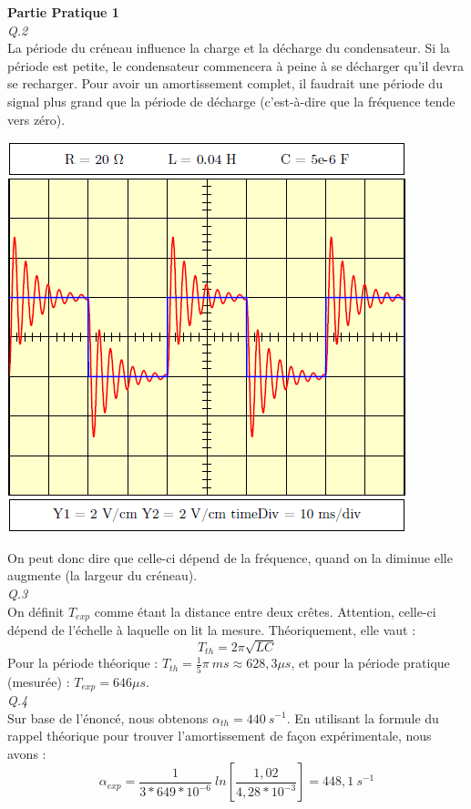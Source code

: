\documentclass	[11pt, a4paper, openany]{book}
\begin{document}
		\textbf{Partie Pratique 1}\\
		\textit{Q.2}\\
		La période du créneau influence la charge et la décharge du condensateur. Si la période est petite, le condensateur commencera à peine à se décharger qu'il devra se recharger. Pour avoir un amortissement complet, il faudrait une période du signal plus grand que la période de décharge (c'est-à-dire que la fréquence tende vers zéro).
		\begin{center}
			\includegraphics[scale=0.5]{labo/image34.png}
		\end{center}
		On peut donc dire que celle-ci dépend de la fréquence, quand on la diminue elle augmente (la largeur du créneau).\\
		
		\textit{Q.3}\\
		On définit $T_{exp}$ comme étant la distance entre deux crêtes. Attention, celle-ci dépend de l'échelle à laquelle on lit la mesure. Théoriquement, elle vaut : 
		\begin{equation}
			T_{th} = 2\pi \sqrt{LC}
		\end{equation}
		Pour la période théorique : $T_{th} = \frac{1}{5}\pi\ ms \approx 628,3\mu s$, et pour la période pratique (mesurée) : $T_{exp} = 646 \mu s$.\\
		
		\textit{Q.4}\\
		Sur base de l'énoncé, nous obtenons $\alpha_{th} = 440\ s^{-1}$. En utilisant la formule du rappel théorique pour trouver l'amortissement de façon expérimentale, nous avons :
		\begin{equation}
			\alpha_{exp} = \frac{1}{3 * 649*10^{-6}}\ ln\left[\frac{1,02}{4,28*10^{-3}}\right] = 448,1\ s^{-1}
		\end{equation}
		
\end{document}
